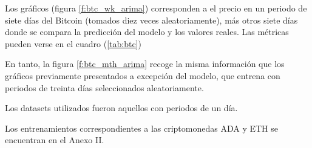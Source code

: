 \documentclass[a4paper,10pt]{article}
\begin{document}
Los gráficos (figura \ref{f:btc_wk_arima}) corresponden a el precio en un periodo de siete días del Bitcoin (tomados diez veces aleatoriamente), más otros siete días donde se compara la predicción del modelo y los valores reales. Las métricas pueden verse en el cuadro (\ref{tab:btc})

En tanto, la figura \ref{f:btc_mth_arima} recoge la misma información que los gráficos previamente presentados a excepción del modelo, que entrena con periodos de treinta días seleccionados aleatoriamente.

Los datasets utilizados fueron aquellos con periodos de un día.

Los entrenamientos correspondientes a las criptomonedas ADA y ETH se encuentran en el Anexo II.

\begin{figure}[h]
 \centering
   \\
    \\

\end{figure}
\end{document}
